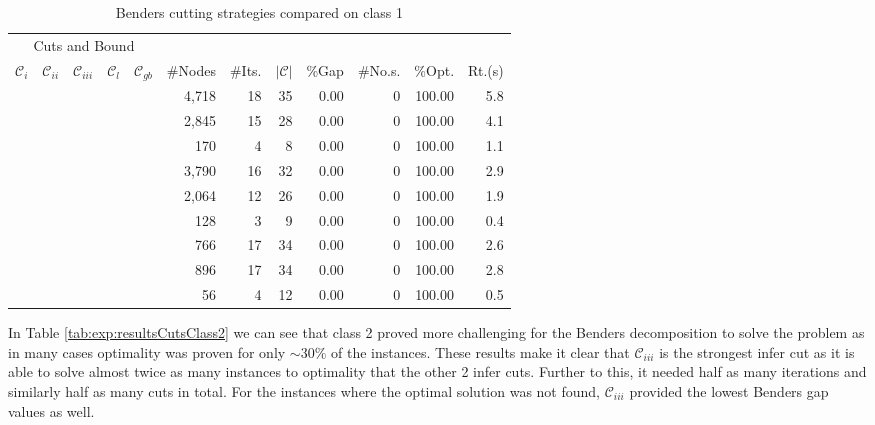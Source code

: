 \begin{table}[tpb]
	\caption{Benders cutting strategies compared on class 1}
	\centering
	\vspace{2mm}
	\begin{tabular}{cccccrrrrrrr}
		\toprule
		\multicolumn{5}{c}{Cuts and Bound}  &  &  &  &  &  &  &   \\\cmidrule(rl){1-5}
		$\mathcal{C}_{i}$ & $\mathcal{C}_{ii}$ & $\mathcal{C}_{iii}$ & $\mathcal{C}_{l}$ & $\mathcal{C}_{gb}$& \#Nodes & \#Its. & $|\mathcal{C}|$ & \%Gap & \#No.s. & \%Opt. & Rt.(s) \\\midrule\midrule
		\checkmark &  &  &  &  & 4,718 & 18 & 35 & 0.00 & 0 & 100.00 & 5.8 \\
		 & \checkmark &  &  &  & 2,845 & 15 & 28 & 0.00 & 0 & 100.00 & 4.1 \\
		 &  & \checkmark &  &  & 170 & 4 & 8 & 0.00 & 0 & 100.00 & 1.1 \\\midrule
		\checkmark &  &  &  & \checkmark & 3,790 & 16 & 32 & 0.00 & 0 & 100.00 & 2.9 \\
		 & \checkmark &  &  & \checkmark & 2,064 & 12 & 26 & 0.00 & 0 & 100.00 & 1.9 \\
		 &  & \checkmark &  & \checkmark & 128 & 3 & 9 & 0.00 & 0 & 100.00 & 0.4 \\\midrule
		\checkmark &  &  & \checkmark & \checkmark & 766 & 17 & 34 & 0.00 & 0 & 100.00 & 2.6 \\
		 & \checkmark &  & \checkmark & \checkmark & 896 & 17 & 34 & 0.00 & 0 & 100.00 & 2.8 \\
		 &  & \checkmark & \checkmark & \checkmark & 56 & 4 & 12 & 0.00 & 0 & 100.00 & 0.5 \\
		\bottomrule
	\end{tabular}
	\label{tab:exp:resultsCutsClass1}
\end{table}

In Table \ref{tab:exp:resultsCutsClass2} we can see that
class 2 proved more challenging for the Benders decomposition
to solve the problem as in many cases optimality was
proven for only $\sim30\%$ of the instances.
These results make it clear that $\mathcal{C}_{iii}$
is the strongest infer cut as it is able to
solve almost twice as many instances to optimality
that the other 2 infer cuts.
Further to this, it needed half as many iterations
and similarly half as many cuts in total.
For the instances where the optimal solution was not found,
$\mathcal{C}_{iii}$ provided the lowest Benders gap values
as well.

